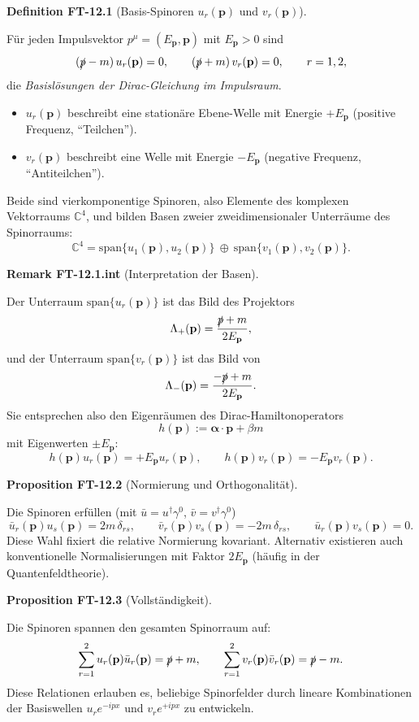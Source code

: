 \documentclass[10pt, letterpaper]{article}
\newcommand{\C}{\mathbb{C}}
\newcommand{\CustomHeading}[3]{%
  \par\medskip\noindent%
  \textbf{#1 #2} \textnormal{(#3)}.\enskip%
}
\newenvironment{DEF}[2]{\begin{unitbox}\CustomHeading{Definition}{#1}{#2}}{\end{unitbox}}
\newenvironment{PROP}[2]{\begin{unitbox}\CustomHeading{Proposition}{#1}{#2}}{\end{unitbox}}
\newenvironment{REM}[2]{\begin{unitbox}\CustomHeading{Remark}{#1}{#2}}{\end{unitbox}}
\begin{document}
\begin{DEF}{FT-12.1}{Basis-Spinoren $u_r(\mathbf p)$ und $v_r(\mathbf p)$}
Für jeden Impulsvektor $p^\mu=(E_{\mathbf p},\mathbf p)$ mit $E_{\mathbf p}>0$ sind
\[
 (\slashed p - m)\,u_r(\mathbf p)=0,\qquad
 (\slashed p + m)\,v_r(\mathbf p)=0,\qquad r=1,2,
\]
die \emph{Basislösungen der Dirac-Gleichung im Impulsraum}.
\begin{itemize}
\item $u_r(\mathbf p)$ beschreibt eine stationäre Ebene-Welle mit Energie $+E_{\mathbf p}$ (positive Frequenz, ``Teilchen'').
\item $v_r(\mathbf p)$ beschreibt eine Welle mit Energie $-E_{\mathbf p}$ (negative Frequenz, ``Antiteilchen'').
\end{itemize}
Beide sind vierkomponentige Spinoren, also Elemente des komplexen Vektorraums $\C^4$, und bilden Basen zweier zweidimensionaler Unterräume des Spinorraums:
\[
 \C^4 = \mathrm{span}\{u_1(\mathbf p),u_2(\mathbf p)\}\ \oplus\ 
        \mathrm{span}\{v_1(\mathbf p),v_2(\mathbf p)\}.
\]
\end{DEF}

\begin{REM}{FT-12.1.int}{Interpretation der Basen}
Der Unterraum $\mathrm{span}\{u_r(\mathbf p)\}$ ist das Bild des Projektors
\[
 \Lambda_+(\mathbf p)=\frac{\slashed p + m}{2E_{\mathbf p}},
\]
und der Unterraum $\mathrm{span}\{v_r(\mathbf p)\}$ ist das Bild von
\[
 \Lambda_-(\mathbf p)=\frac{-\slashed p + m}{2E_{\mathbf p}}.
\]
Sie entsprechen also den Eigenräumen des Dirac-Hamiltonoperators
\[
 h(\mathbf p):=\boldsymbol{\alpha}\cdot\mathbf p+\beta m
\]
mit Eigenwerten $\pm E_{\mathbf p}$:
\[
 h(\mathbf p)u_r(\mathbf p)=+E_{\mathbf p}u_r(\mathbf p),\qquad
 h(\mathbf p)v_r(\mathbf p)=-E_{\mathbf p}v_r(\mathbf p).
\]
\end{REM}

\begin{PROP}{FT-12.2}{Normierung und Orthogonalität}
Die Spinoren erfüllen (mit $\bar u=u^\dagger\gamma^0$, $\bar v=v^\dagger\gamma^0$)
\[
 \bar u_r(\mathbf p)u_s(\mathbf p)=2m\,\delta_{rs},\qquad
 \bar v_r(\mathbf p)v_s(\mathbf p)=-2m\,\delta_{rs},\qquad
 \bar u_r(\mathbf p)v_s(\mathbf p)=0.
\]
Diese Wahl fixiert die relative Normierung kovariant. Alternativ existieren auch konventionelle Normalisierungen mit Faktor $2E_{\mathbf p}$ (häufig in der Quantenfeldtheorie).
\end{PROP}

\begin{PROP}{FT-12.3}{Vollständigkeit}
Die Spinoren spannen den gesamten Spinorraum auf:
\[
 \sum_{r=1}^2 u_r(\mathbf p)\bar u_r(\mathbf p)=\slashed p + m,\qquad
 \sum_{r=1}^2 v_r(\mathbf p)\bar v_r(\mathbf p)=\slashed p - m.
\]
Diese Relationen erlauben es, beliebige Spinorfelder durch lineare Kombinationen der Basiswellen $u_r e^{-ipx}$ und $v_r e^{+ipx}$ zu entwickeln.
\end{PROP}
\end{document}
